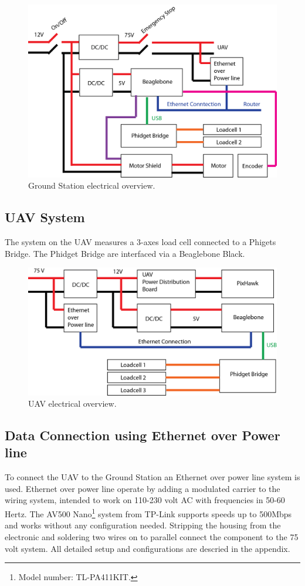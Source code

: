\begin{figure}[hbtp]
\centering
\includegraphics[scale=0.75]{graphics/GCS-eltectrical-overview.png}
\caption{Ground Station electrical overview.}
\end{figure}


\subsection{UAV System}
The system on the UAV measures a 3-axes load cell connected to a Phigets Bridge. The Phidget Bridge are interfaced via a Beaglebone Black.  

\begin{figure}[hbtp]
\centering
\includegraphics[scale=0.75]{graphics/UAV-electrical-system.png}
\caption{UAV electrical overview.}
\end{figure}



\subsection{Data Connection using Ethernet over Power line}
To connect the UAV to the Ground Station an Ethernet over power line system is used. Ethernet over power line operate by adding a modulated carrier to the wiring system, intended to work on 110-230 volt AC with frequencies in 50-60 Hertz. The AV500 Nano\footnote{Model number: TL-PA411KIT.} system from TP-Link supports speeds up to 500Mbps and works without any configuration needed. Stripping the housing from the electronic and soldering two wires on to parallel connect the component to the 75 volt system. All detailed setup and configurations are descried in the appendix.

